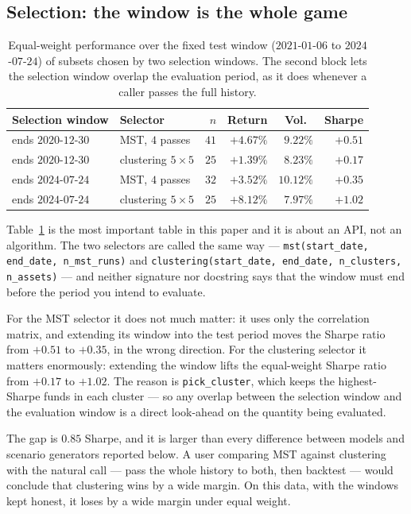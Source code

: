\documentclass[11pt,a4paper]{article}
\newcommand{\code}[1]{\texttt{#1}}
\begin{document}
\subsection{Selection: the window is the whole game}
\label{sec:lookahead}

\begin{table}[t]
\centering
\caption{Equal-weight performance over the fixed test window
($2021$-$01$-$06$ to $2024$-$07$-$24$) of subsets chosen by two selection
windows. The second block lets the selection window overlap the evaluation
period, as it does whenever a caller passes the full history.}
\label{tab:lookahead}
\begin{tabular}{llrrrr}
\toprule
Selection window & Selector & $n$ & Return & Vol.\ & Sharpe \\
\midrule
ends $2020$-$12$-$30$ & MST, $4$ passes      & $41$ & $+4.67\%$ & $9.22\%$  & $+0.51$ \\
ends $2020$-$12$-$30$ & clustering $5\times5$ & $25$ & $+1.39\%$ & $8.23\%$  & $+0.17$ \\
\midrule
ends $2024$-$07$-$24$ & MST, $4$ passes      & $32$ & $+3.52\%$ & $10.12\%$ & $+0.35$ \\
ends $2024$-$07$-$24$ & clustering $5\times5$ & $25$ & $+8.12\%$ & $7.97\%$  & $+1.02$ \\
\bottomrule
\end{tabular}
\end{table}

Table~\ref{tab:lookahead} is the most important table in this paper and it is
about an API, not an algorithm. The two selectors are called the same way ---
\code{mst(start\_date, end\_date, n\_mst\_runs)} and
\code{clustering(start\_date, end\_date, n\_clusters, n\_assets)} --- and
neither signature nor docstring says that the window must end before the period
you intend to evaluate.

For the MST selector it does not much matter: it uses only the correlation
matrix, and extending its window into the test period moves the Sharpe ratio
from $+0.51$ to $+0.35$, in the wrong direction. For the clustering selector it
matters enormously: extending the window lifts the equal-weight Sharpe ratio
from $+0.17$ to $+1.02$. The reason is \code{pick\_cluster}, which keeps the
highest-Sharpe funds in each cluster --- so any overlap between the selection
window and the evaluation window is a direct look-ahead on the quantity being
evaluated.

The gap is $0.85$ Sharpe, and it is larger than every difference between models
and scenario generators reported below. A user comparing MST against clustering
with the natural call --- pass the whole history to both, then backtest --- would
conclude that clustering wins by a wide margin. On this data, with the windows
kept honest, it loses by a wide margin under equal weight.
\end{document}
